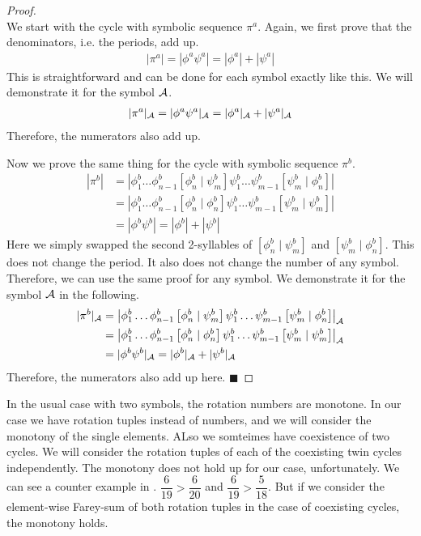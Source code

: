 \begin{proof} \phantom{x} \\
	We start with the cycle with symbolic sequence $\pi^a$.
	Again, we first prove that the denominators, i.e. the periods, add up.
	\begin{align*}
		|\pi^a| = |\phi^a\psi^a| = |\phi^a| + |\psi^a|
	\end{align*}
	This is straightforward and can be done for each symbol exactly like this.
	We will demonstrate it for the symbol $\mathcal{A}$.
	\begin{align*}
		|\pi^a|_{\mathcal{A}} = |\phi^a\psi^a|_{\mathcal{A}} = |\phi^a|_{\mathcal{A}} + |\psi^a|_{\mathcal{A}}
	\end{align*}
	Therefore, the numerators also add up.

	Now we prove the same thing for the cycle with symbolic sequence $\pi^b$.
	\begin{align*}
		|\pi^b| & = \left|\phi^b_1 \dots \phi^b_{n-1} \left[\phi^b_n \mid \psi^b_m\right] \psi^b_1 \dots \psi^b_{m-1} \left[\psi^b_m \mid \phi^b_n\right]\right| \\
		        & = \left|\phi^b_1 \dots \phi^b_{n-1} \left[\phi^b_n \mid \phi^b_n\right] \psi^b_1 \dots \psi^b_{m-1} \left[\psi^b_m \mid \psi^b_m\right]\right| \\
		        & = |\phi^b \psi^b| = |\phi^b| + |\psi^b|
	\end{align*}
	Here we simply swapped the second 2-syllables of $\left[\phi^b_n \mid \psi^b_m\right]$ and $\left[\psi^b_m \mid \phi^b_n\right]$.
	This does not change the period.
	It also does not change the number of any symbol.
	Therefore, we can use the same proof for any symbol.
	We demonstrate it for the symbol $\mathcal{A}$ in the following.
	\begin{align*}
		|\pi^b|_{\mathcal{A}} & = \left|\phi^b_1 \dots \phi^b_{n-1} \left[\phi^b_n \mid \psi^b_m\right] \psi^b_1 \dots \psi^b_{m-1} \left[\psi^b_m \mid \phi^b_n\right]\right|_{\mathcal{A}} \\
		           & = \left|\phi^b_1 \dots \phi^b_{n-1} \left[\phi^b_n \mid \phi^b_n\right] \psi^b_1 \dots \psi^b_{m-1} \left[\psi^b_m \mid \psi^b_m\right]\right|_{\mathcal{A}} \\
		           & = |\phi^b \psi^b|_{\mathcal{A}} = |\phi^b|_{\mathcal{A}} + |\psi^b|_{\mathcal{A}}
	\end{align*}
	Therefore, the numerators also add up here.
	\hfill $\blacksquare$
\end{proof}

In the usual case with two symbols, the rotation numbers are monotone.
In our case we have rotation tuples instead of numbers, and we will consider the monotony of the single elements.
ALso we somteimes have coexistence of two cycles.
We will consider the rotation tuples of each of the coexisting twin cycles independently.
The monotony does not hold up for our case, unfortunately.
We can see a counter example in .
$\dfrac{6}{19} > \dfrac{6}{20}$ and $\dfrac{6}{19} > \dfrac{5}{18}$.
But if we consider the element-wise Farey-sum of both rotation tuples in the case of coexisting cycles, the monotony holds.

